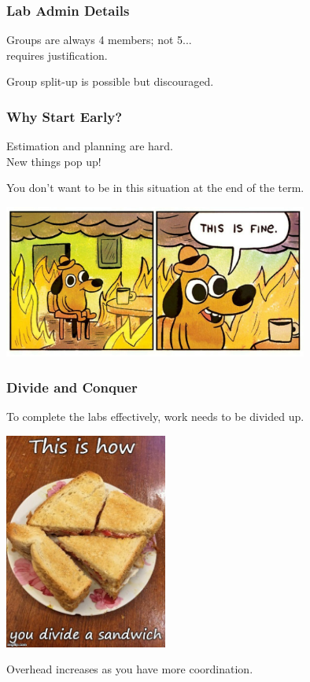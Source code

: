 \begin{frame}
\frametitle{Lab Admin Details}

Groups are always 4 members; not 5...\\
 requires justification.

Group split-up is possible but discouraged.

\end{frame}

\begin{frame}
\frametitle{Why Start Early?}

Estimation and planning are hard.\\
\quad New things pop up!


You don't want to be in this situation at the end of the term.
\begin{center}
	\includegraphics[width=0.75\textwidth]{images/thisisfine.jpg}
\end{center}

\end{frame}

\begin{frame}
\frametitle{Divide and Conquer}

To complete the labs effectively, work needs to be divided up.

\begin{center}
	\includegraphics[width=0.4\textwidth]{images/sandwich.jpg}
\end{center}

Overhead increases as you have more coordination.
\end{frame}


